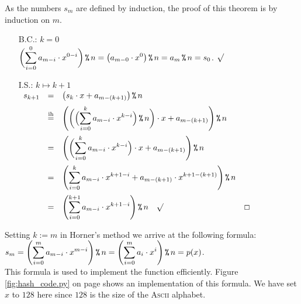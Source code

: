 \proof
As the numbers $s_m$ are defined by induction, the proof of this theorem is by
induction on $m$.
\begin{enumerate}
\item[B.C.:] $k = 0$
             \\[0.2cm]
             \hspace*{1.3cm}
           $\displaystyle\biggl(\sum\limits_{i=0}^0 a_{m-i} \cdot x^{0-i}\biggr) \,\texttt{\%}\, n = \bigl(a_{m-0} \cdot x^0
          \bigr)\,\texttt{\%}\, n = a_m \,\texttt{\%}\, n = s_0$. $\surd$
\item[I.S.:] $k \mapsto k + 1$
             \\[0.2cm]
             \hspace*{1.3cm}
             $
             \begin{array}{lcll}
               s_{k+1} & = & \bigl(s_k \cdot x + a_{m - (k+1)} \bigr) \,\texttt{\%}\, n \\[0.2cm]
                      & \stackrel{\mathrm{ih}}{=} & \displaystyle\Biggl(\biggl(\Bigl(\sum\limits_{i=0}^k a_{m-i} \cdot x^{k-i} \Bigr) \,\texttt{\%}\, n\biggr) \cdot x + a_{m - (k+1)}\Biggr) \,\texttt{\%}\, n
                                         \\[0.5cm]
                      & = & \displaystyle\Biggl(\biggl(\sum\limits_{i=0}^k a_{m-i} \cdot x^{k-i} \Bigr) \cdot x + a_{m - (k+1)}\Biggr) \,\texttt{\%}\, n
                            \\[0.5cm]
                      & = & \displaystyle\Biggl(\sum\limits_{i=0}^k a_{m-i} \cdot x^{k+1-i}  + a_{m - (k+1)} \cdot x^{k+1-(k+1)}\Biggr) \,\texttt{\%}\, n
                            \\[0.5cm]
                      & = & \displaystyle\Biggl(\sum\limits_{i=0}^{k+1} a_{m-i} \cdot x^{k+1-i}  \Biggr) \,\texttt{\%}\, n \quad \surd & \Box
             \end{array}
             $
\end{enumerate}
Setting $k := m$ in Horner's method we arrive at the following formula:
\\[0.2cm]
\hspace*{1.3cm}
$\displaystyle s_m = \Biggl(\sum\limits_{i=0}^m a_{m - i} \cdot x^{m - i}\Biggr) \,\texttt{\%}\, n = \Biggl(\sum\limits_{i=0}^m a_{i} \cdot x^{i}\Biggr) \,\texttt{\%}\, n = p(x)$.
\\[0.2cm]
This formula is used to implement the function  efficiently.
Figure \ref{fig:hash_code.py} on page \pageref{fig:hash_code.py} shows an implementation of this formula.  We
have set $x$ to $128$ here since $128$ is the size of the \textsc{Ascii} alphabet.

